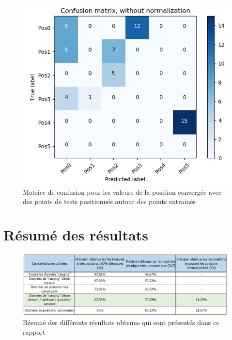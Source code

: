 \begin{figure}[htp]
	\begin{center}
		\includegraphics[scale=0.5]{figures/mat_pos_conv_Tx.png}
		\caption{Matrice de confusion pour les valeurs de la position convergée avec des points de tests positionnés autour des points entrainés}
		\label{fig:matPosConvTx} %
	\end{center}
\end{figure}

\section{Résumé des résultats}

\begin{figure}[htp]
	\begin{center}
		\includegraphics[scale=0.5]{figures/Resultats.png}
		\caption{Résumé des différents résultats obtenus qui sont présentés dans ce rapport}
		\label{fig:result} %
	\end{center}
\end{figure}


